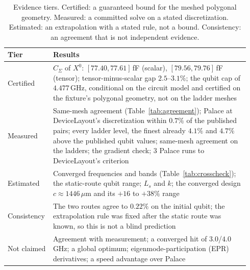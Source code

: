 \documentclass{anvil-paper}
\begin{document}
\begin{table}[tbp]
  \centering
  \caption{Evidence tiers. Certified: a guaranteed bound for the meshed
  polygonal geometry. Measured: a committed solve on a stated
  discretization. Estimated: an extrapolation with a stated rule, not a
  bound. Consistency: an agreement that is not independent evidence.}
  \label{tab:tiers}
  \footnotesize
  \begin{tabular}{@{}>{\raggedright\arraybackslash}p{0.15\linewidth}>{\raggedright\arraybackslash}p{0.79\linewidth}@{}}
    \toprule
    Tier & Results \\
    \midrule
    Certified & $C_\Sigma$ of $X^0$: $[77.40, 77.61]$\,fF (scalar), $[79.56, 79.76]$\,fF (tensor); tensor-minus-scalar gap $2.5$--$3.1\%$; the qubit cap of $4.477$\,GHz, conditional on the circuit model and certified on the fixture's polygonal geometry, not on the ladder meshes \\
    Measured & Same-mesh agreement (Table~\ref{tab:agreement}); Palace at DeviceLayout's discretization within $0.7\%$ of the published pairs; every ladder level, the finest already $4.1\%$ and $4.7\%$ above the published qubit values; same-mesh agreement on the ladders; the gradient check; 3 Palace runs to DeviceLayout's criterion \\
    Estimated & Converged frequencies and bands (Table~\ref{tab:crosscheck}); the static-route qubit range; $L_s$ and $k$; the converged design $c \approx 1446\,\mu$m and its $+16$ to $+38\%$ range \\
    Consistency & The two routes agree to $0.22\%$ on the initial qubit; the extrapolation rule was fixed after the static route was known, so this is not a blind prediction \\
    Not claimed & Agreement with measurement; a converged hit of $3.0$/$4.0$\,GHz; a global optimum; eigenmode-participation (EPR) derivatives; a speed advantage over Palace \\
    \bottomrule
  \end{tabular}
\end{table}
\end{document}
